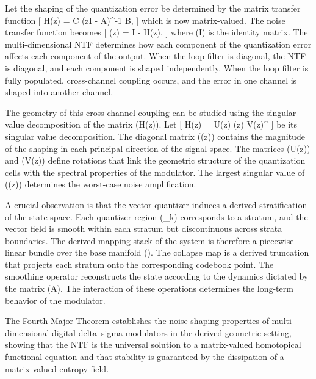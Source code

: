 Let the shaping of the quantization error be determined by the matrix transfer function
[
H(z) = C (zI - A)^{-1} B,
]
which is now matrix-valued. The noise transfer function becomes
[
(z) = I - H(z),
]
where (I) is the identity matrix. The multi-dimensional NTF determines how each component of the quantization error affects each component of the output. When the loop filter is diagonal, the NTF is diagonal, and each component is shaped independently. When the loop filter is fully populated, cross-channel coupling occurs, and the error in one channel is shaped into another channel.

The geometry of this cross-channel coupling can be studied using the singular value decomposition of the matrix (H(z)). Let
[
H(z) = U(z) \Sigma(z) V(z)^\top
]
be its singular value decomposition. The diagonal matrix (\Sigma(z)) contains the magnitude of the shaping in each principal direction of the signal space. The matrices (U(z)) and (V(z)) define rotations that link the geometric structure of the quantization cells with the spectral properties of the modulator. The largest singular value of ((z)) determines the worst-case noise amplification.

A crucial observation is that the vector quantizer induces a derived stratification of the state space. Each quantizer region (\Omega_k) corresponds to a stratum, and the vector field is smooth within each stratum but discontinuous across strata boundaries. The derived mapping stack of the system is therefore a piecewise-linear bundle over the base manifold (\Lambda). The collapse map is a derived truncation that projects each stratum onto the corresponding codebook point. The smoothing operator reconstructs the state according to the dynamics dictated by the matrix (A). The interaction of these operations determines the long-term behavior of the modulator.

The Fourth Major Theorem establishes the noise-shaping properties of multi-dimensional digital delta--sigma modulators in the derived-geometric setting, showing that the NTF is the universal solution to a matrix-valued homotopical functional equation and that stability is guaranteed by the dissipation of a matrix-valued entropy field.

